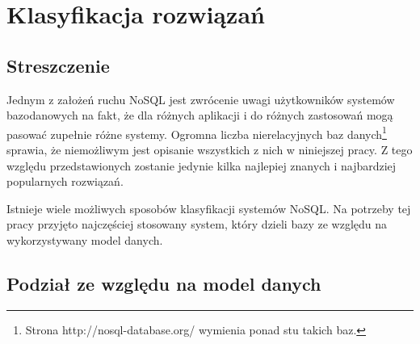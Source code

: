 \chapter{Klasyfikacja rozwiązań}

\section*{Streszczenie}

Jednym z założeń ruchu NoSQL jest zwrócenie uwagi użytkowników systemów bazodanowych na fakt, że dla różnych aplikacji i do różnych zastosowań mogą pasować zupełnie różne systemy.
Ogromna liczba nierelacyjnych baz danych\footnote{Strona http://nosql-database.org/ wymienia ponad stu takich baz.} sprawia, że niemożliwym jest opisanie wszystkich z nich w niniejszej pracy.
Z tego względu przedstawionych zostanie jedynie kilka najlepiej znanych i najbardziej popularnych rozwiązań.

Istnieje wiele możliwych sposobów klasyfikacji systemów NoSQL.
Na potrzeby tej pracy przyjęto najczęściej stosowany system, który dzieli bazy ze względu na wykorzystywany model danych.

\section{Podział ze względu na model danych}

